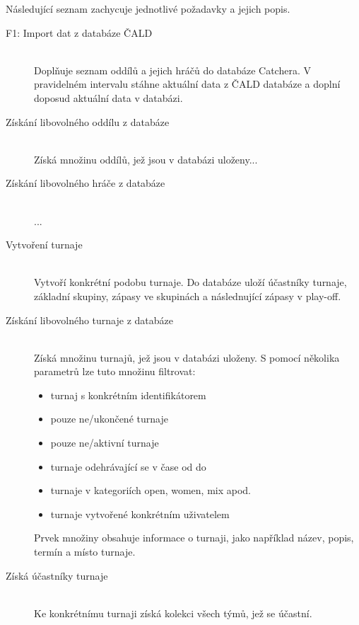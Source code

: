 \documentclass[thesis=B,czech]{FITthesis}[2012/06/26]
\begin{document}
Následující seznam zachycuje jednotlivé požadavky a jejich popis.


\begin{description}
 \item[F1: Import dat z databáze ČALD] \hfill \\
 Doplňuje seznam oddílů a jejich hráčů do databáze Catchera. V pravidelném intervalu stáhne
 aktuální data z ČALD databáze a doplní doposud aktuální data v databázi.

 
 \item[Získání libovolného oddílu z databáze] \hfill \\
 Získá množinu oddílů, jež jsou v databázi uloženy...
 
 \item[Získání libovolného hráče z databáze] \hfill \\
 ...
 
 \item[Vytvoření turnaje] \hfill \\
 Vytvoří konkrétní podobu turnaje. Do databáze uloží účastníky turnaje, základní skupiny,
 zápasy ve skupinách a následnující zápasy v play-off.
 
 \item[Získání libovolného turnaje z databáze] \hfill \\
 Získá množinu turnajů, jež jsou v databázi uloženy. S pomocí několika parametrů lze tuto
 množinu filtrovat:
 \begin{itemize}
    \item turnaj s konkrétním identifikátorem
    \item pouze ne/ukončené turnaje
    \item pouze ne/aktivní turnaje
    \item turnaje odehrávající se v čase od do
    \item turnaje v kategoriích open, women, mix apod.
    \item turnaje vytvořené konkrétním uživatelem
  \end{itemize}
  Prvek množiny obsahuje informace o turnaji, jako například název, popis, termín a místo turnaje.
 
 \item[Získá účastníky turnaje] \hfill \\
 Ke konkrétnímu turnaji získá kolekci všech týmů, jež se účastní. 
 

\end{description}
\end{document}
